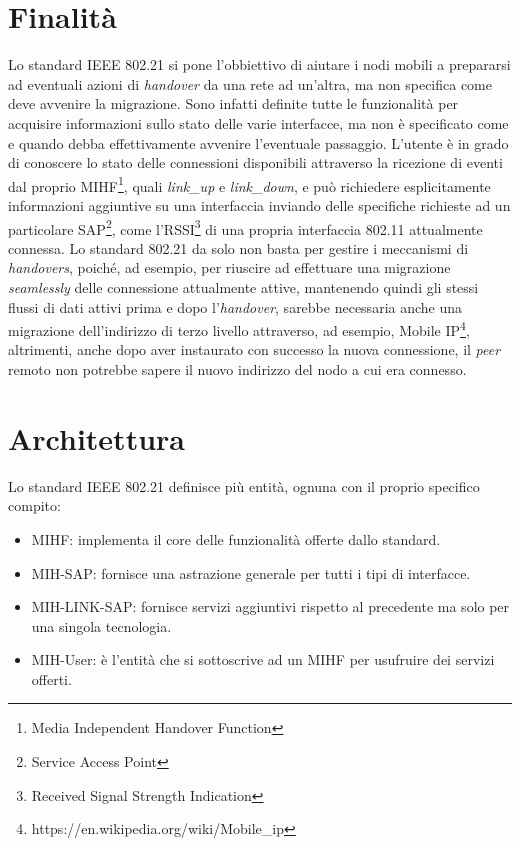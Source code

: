 \section{Finalità}
Lo standard IEEE 802.21 si pone l'obbiettivo di aiutare i nodi mobili a prepararsi ad eventuali azioni di {\em handover} da una rete ad un'altra, ma non specifica come deve avvenire la migrazione. Sono infatti definite tutte le funzionalità per acquisire informazioni sullo stato delle varie interfacce, ma non è specificato come e quando debba effettivamente avvenire l'eventuale passaggio. L'utente è in grado di conoscere lo stato delle connessioni disponibili attraverso la ricezione di eventi dal proprio MIHF\footnote{Media Independent Handover Function}, quali {\em link\_up} e {\em link\_down}, e può richiedere esplicitamente informazioni aggiuntive su una interfaccia inviando delle specifiche richieste ad un particolare SAP\footnote{Service Access Point}, come l'RSSI\footnote{Received Signal Strength Indication} di una propria interfaccia 802.11 attualmente connessa. Lo standard 802.21 da solo non basta per gestire i meccanismi di {\em handovers}, poiché, ad esempio, per riuscire ad effettuare una migrazione {\em seamlessly} delle connessione attualmente attive, mantenendo quindi gli stessi flussi di dati attivi prima e dopo l'{\em handover}, sarebbe necessaria anche una migrazione dell'indirizzo di terzo livello attraverso, ad esempio, Mobile IP\footnote{https://en.wikipedia.org/wiki/Mobile\_ip}, altrimenti, anche dopo aver instaurato con successo la nuova connessione, il {\em peer} remoto non potrebbe sapere il nuovo indirizzo del nodo a cui era connesso.

\section{Architettura}
Lo standard IEEE 802.21 definisce più entità, ognuna con il proprio specifico compito:
\begin{itemize}
\item MIHF: implementa il core delle funzionalità offerte dallo standard.
\item MIH-SAP: fornisce una astrazione generale per tutti i tipi di interfacce.
\item MIH-LINK-SAP: fornisce servizi aggiuntivi rispetto al precedente ma solo per una singola tecnologia.
\item MIH-User: è l'entità che si sottoscrive ad un MIHF per usufruire dei servizi offerti.
\end{itemize}

